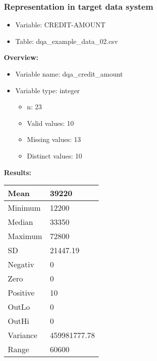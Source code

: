 \documentclass[
]{article}
\providecommand{\tightlist}{%
  \setlength{\itemsep}{0pt}\setlength{\parskip}{0pt}}
\begin{document}
\newpage

\hypertarget{representation-in-target-data-system-1}{%
\subsubsection{\texorpdfstring{Representation in \textbf{target} data
system}{Representation in target data system}}\label{representation-in-target-data-system-1}}

\begin{itemize}
\tightlist
\item
  Variable: CREDIT-AMOUNT
\item
  Table: dqa\_example\_data\_02.csv
\end{itemize}

\textbf{Overview:}

\begin{itemize}
\tightlist
\item
  Variable name: dqa\_credit\_amount
\item
  Variable type: integer

  \begin{itemize}
  \tightlist
  \item
    n: 23
  \item
    Valid values: 10
  \item
    Missing values: 13
  \item
    Distinct values: 10
  \end{itemize}
\end{itemize}

\textbf{Results:}\\

\begin{table}[H]
\centering
\begin{tabular}{l|l}
\hline
Mean & 39220\\
\hline
Minimum & 12200\\
\hline
Median & 33350\\
\hline
Maximum & 72800\\
\hline
SD & 21447.19\\
\hline
Negativ & 0\\
\hline
Zero & 0\\
\hline
Positive & 10\\
\hline
OutLo & 0\\
\hline
OutHi & 0\\
\hline
Variance & 459981777.78\\
\hline
Range & 60600\\
\hline
\end{tabular}
\end{table}
\end{document}
